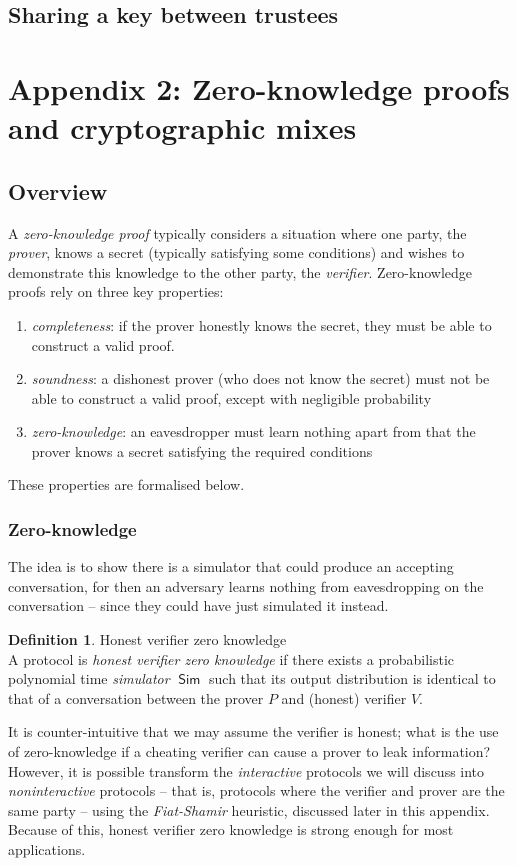 \documentclass[11pt,twoside,a4paper]{article}
\DeclareMathOperator{\Sim}{\mathsf{Sim}}
\theoremstyle{definition}
\newtheorem{definition}{Definition}[section]
\begin{document}
\subsection{Sharing a key between trustees}

\vfill\pagebreak
\section{Appendix 2: Zero-knowledge proofs and cryptographic mixes}\label{app-proof}
\subsection{Overview}
A \textit{zero-knowledge proof} typically considers a situation where one party, the \textit{prover}, knows a secret (typically satisfying some conditions) and wishes to demonstrate this knowledge to the other party, the \textit{verifier}. Zero-knowledge proofs rely on three key properties:
\begin{enumerate}
    \item \textit{completeness}: if the prover honestly knows the secret, they must be able to construct a valid proof.
    \item \textit{soundness}: a dishonest prover (who does not know the secret) must not be able to construct a valid proof, except with negligible probability
    \item \textit{zero-knowledge}: an eavesdropper must learn nothing apart from that the prover knows a secret satisfying the required conditions
\end{enumerate}
These properties are formalised below.
\subsubsection{Zero-knowledge}
The idea is to show there is a simulator that could produce an accepting conversation, for then an adversary learns nothing from eavesdropping on the conversation -- since they could have just simulated it instead.~\cite{boneh2015graduate}
\begin{definition}{Honest verifier zero knowledge}\\
    A protocol is \textit{honest verifier zero knowledge} if there exists a probabilistic polynomial time \textit{simulator} \(\Sim\) such that its output distribution is identical to that of a conversation between the prover \(P\) and (honest) verifier \(V\).
\end{definition}
It is counter-intuitive that we may assume the verifier is honest; what is the use of zero-knowledge if a cheating verifier can cause a prover to leak information? However, it is possible transform the \textit{interactive} protocols we will discuss into \textit{noninteractive} protocols -- that is, protocols where the verifier and prover are the same party -- using the \textit{Fiat-Shamir} heuristic, discussed later in this appendix. Because of this, honest verifier zero knowledge is strong enough for most applications.
\end{document}
